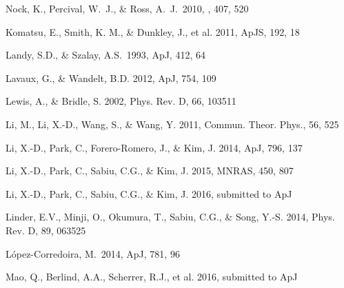 \documentclass[iop]{emulateapj}
\begin{document}
\begin{thebibliography}{}
 Nock, K., Percival, W.~J., \& Ross, A.~J.\ 2010, \mnras, 407, 520 


Komatsu, E., Smith, K. M., \& Dunkley, J., et al. 2011, ApJS, 192, 18  



Landy, S.D., \& Szalay, A.S.\ 1993, ApJ, 412, 64 


Lavaux, G., \& Wandelt, B.D. 2012, ApJ, 754, 109  


Lewis, A., \& Bridle, S. 2002, Phys. Rev. D, 66, 103511


Li, M., Li, X.-D., Wang, S., \& Wang, Y. 2011, Commun. Theor. Phys., 56, 525

Li, X.-D., Park, C., Forero-Romero, J., \& Kim, J. 2014, ApJ, 796, 137

Li, X.-D., Park, C., Sabiu, C.G., \& Kim, J. 2015, MNRAS, 450, 807 

Li, X.-D., Park, C., Sabiu, C.G., \& Kim, J. 2016, submitted to ApJ



Linder, E.V., Minji, O., Okumura, T., Sabiu, C.G., \& Song, Y.-S. 2014, Phys. Rev. D, 89, 063525  

L{\'o}pez-Corredoira, M.\ 2014, ApJ, 781, 96 

Mao, Q., Berlind, A.A., Scherrer, R.J., et al. 2016, submitted to ApJ


\end{thebibliography}
\end{document}
